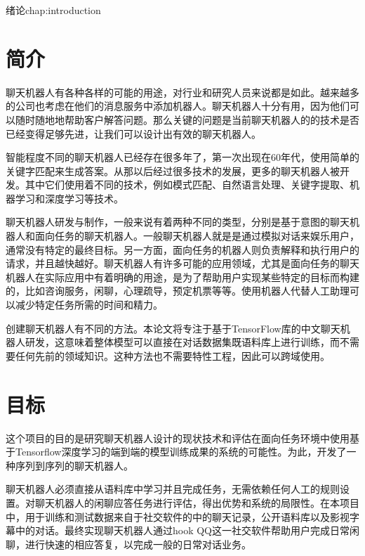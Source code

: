 \begin{cuzchapter}{绪论}{chap:introduction}

\section{简介}\label{sec:background}

聊天机器人有各种各样的可能的用途，对行业和研究人员来说都是如此。越来越多的公司也考虑在他们的消息服务中添加机器人。聊天机器人十分有用，因为他们可以随时随地地帮助客户解答问题。那么关键的问题是当前聊天机器人的的技术是否已经变得足够先进，让我们可以设计出有效的聊天机器人。

智能程度不同的聊天机器人已经存在很多年了，第一次出现在60年代，\cite{Weizenbaum:1966:ECP:365153.365168}使用简单的关键字匹配来生成答案。从那以后经过很多技术的发展，更多的聊天机器人被开发。其中它们使用着不同的技术，例如模式匹配、自然语言处理、关键字提取、机器学习和深度学习等技术。

聊天机器人研发与制作，一般来说有着两种不同的类型，分别是基于意图的聊天机器人和面向任务的聊天机器人。一般聊天机器人就是是通过模拟对话来娱乐用户，通常没有特定的最终目标。另一方面，面向任务的机器人则负责解释和执行用户的请求，并且越快越好。聊天机器人有许多可能的应用领域，尤其是面向任务的聊天机器人在实际应用中有着明确的用途，是为了帮助用户实现某些特定的目标而构建的，比如咨询服务，闲聊，心理疏导，预定机票等等。使用机器人代替人工助理可以减少特定任务所需的时间和精力。

创建聊天机器人有不同的方法。本论文将专注于基于TensorFlow库的中文聊天机器人研发，这意味着整体模型可以直接在对话数据集既语料库上进行训练，而不需要任何先前的领域知识。这种方法也不需要特性工程，因此可以跨域使用。
\section{目标}\label{sec:background}

这个项目的目的是研究聊天机器人设计的现状技术和评估在面向任务环境中使用基于Tensorflow深度学习的端到端的模型训练成果的系统的可能性。为此，开发了一种序列到序列的聊天机器人。

聊天机器人必须直接从语料库中学习并且完成任务，无需依赖任何人工的规则设置。对聊天机器人的闲聊应答任务进行评估，得出优势和系统的局限性。在本项目中，用于训练和测试数据来自于社交软件的中的聊天记录，公开语料库以及影视字幕中的对话。最终实现聊天机器人通过hook QQ这一社交软件帮助用户完成日常闲聊，进行快速的相应答复，以完成一般的日常对话业务。

\end{cuzchapter}